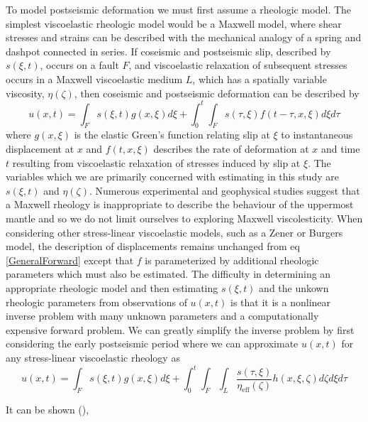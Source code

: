 \documentclass[12pt]{article}
\begin{document}
To model postseismic deformation we must first assume a rheologic model.  The simplest viscoelastic rheologic model would be a Maxwell model, where shear stresses and strains can be described with the mechanical analogy of a spring and dashpot connected in series.  If coseismic and postseismic slip, described by $s(\xi,t)$, occurs on a fault $F$, and viscoelastic relaxation of subsequent stresses occurs in a Maxwell viscoelastic medium $L$, which has a spatially variable viscosity, $\eta(\zeta)$, then coseismic and postseismic deformation can be described by 
\begin{equation}\label{GeneralForward}
  u(x,t) = \int_F s(\xi,t)g(x,\xi)d\xi + 
           \int_0^t\int_F s(\tau,\xi) f(t-\tau,x,\xi) d\xi d\tau
\end{equation}
where $g(x,\xi)$ is the elastic Green's function relating slip at $\xi$ to instantaneous displacement at $x$ and $f(t,x,\xi)$ describes the rate of deformation at $x$ and time $t$ resulting from viscoelastic relaxation of stresses induced by slip  at $\xi$.  The variables which we are primarily concerned with estimating in this study are $s(\xi,t)$ and $\eta(\zeta)$.  Numerous experimental and geophysical studies suggest that a Maxwell rheology is inappropriate to describe the behaviour of the uppermost mantle \cite{Chopra1997} \cite{Pollitz2003} \cite{Freed2004} and so we do not limit ourselves to exploring Maxwell viscolesticity.  When considering other stress-linear viscoelastic models, such as a Zener or Burgers model, the description of displacements remains unchanged from eq \ref{GeneralForward} except that $f$ is parameterized by additional rheologic parameters which must also be estimated.  The difficulty in  determining an appropriate rheologic model and then estimating $s(\xi,t)$ and the unkown rheologic parameters from observations of $u(x,t)$ is that it is a nonlinear inverse problem with many unknown parameters and a computationally expensive forward problem.  We can greatly simplify the inverse problem by first considering the early postseismic period where we can approximate $u(x,t)$ for any stress-linear viscoelastic rheology as
\begin{equation}\label{ApproxForward}
  u(x,t) = \int_F s(\xi,t)g(x,\xi)d\xi + 
           \int_0^t\int_F\int_L \frac{s(\tau,\xi)}{\eta_\mathrm{eff}(\zeta)} h(x,\xi,\zeta) d\zeta d\xi d\tau
\end{equation}




It can be shown (\cite{Hines2015}),     
\end{document}
